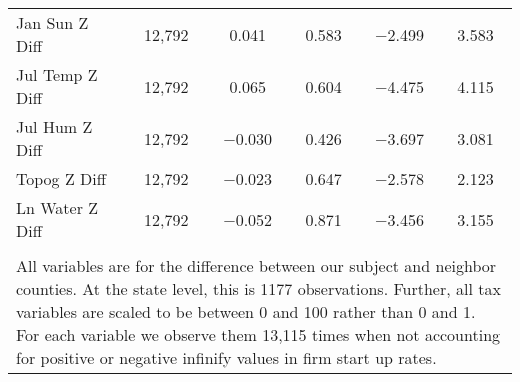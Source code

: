 \begin{table}[!htbp]
\begin{tabular}{@{\extracolsep{5pt}}lccccc}
Jan Sun Z Diff & 12,792 & 0.041 & 0.583 & $-$2.499 & 3.583 \\ 
Jul Temp Z Diff & 12,792 & 0.065 & 0.604 & $-$4.475 & 4.115 \\ 
Jul Hum Z Diff & 12,792 & $-$0.030 & 0.426 & $-$3.697 & 3.081 \\ 
Topog Z Diff & 12,792 & $-$0.023 & 0.647 & $-$2.578 & 2.123 \\ 
Ln Water Z Diff & 12,792 & $-$0.052 & 0.871 & $-$3.456 & 3.155 \\ 
\hline \\[-1.8ex] 
\multicolumn{6}{l}{All variables are for the difference between our subject and neighbor counties. At the state level, this is 1177 observations. Further, all tax variables are scaled to be between 0 and 100 rather than 0 and 1. For each variable we observe them 13,115 times when not accounting for positive or negative infinify values in firm start up rates.} \\ 
\end{tabular} 
\end{table} 
